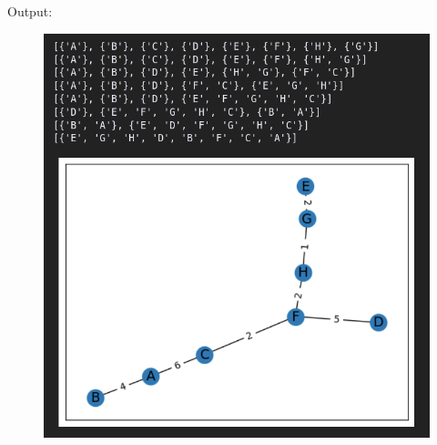 \documentclass{article}
\begin{document}
    \begin{center}
        \begin{minipage}[t]{0.9\textwidth}
            Output:
            \begin{figure}[H]
                \centering
                \includegraphics[width=1\textwidth, height=0.2\textheight]{"./part1_output.png"}
            \end{figure}
        \end{minipage}
    \end{center}
\end{document}
